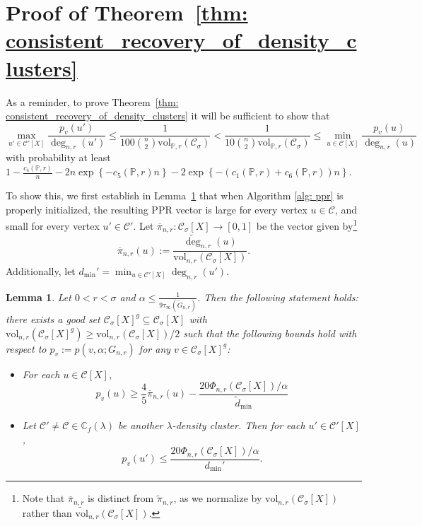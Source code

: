 \documentclass[11pt,twoside]{article}
\newtheorem{lemma}{Lemma}
\newcommand{\set}[1]{\left\{#1\right\}}
\newcommand{\vol}{\mathrm{vol}}
\newcommand{\1}{\mathbf{1}}
\newcommand{\pbf}{p}        %
\newcommand{\pibf}{\pi}
\newcommand{\Xbf}{X}             %
\newcommand{\Pbb}{\mathbb{P}}
\newcommand{\Cbb}{\mathbb{C}}
\newcommand{\Cset}{\mathcal{C}}
\newcommand{\Csig}{\Cset_{\sigma}}
\newcommand{\degminpr}{d_{\min}'}
\newcommand{\degminwt}{\widetilde{d}_{\min}}
\begin{document}
\section{Proof of Theorem~\ref{thm: consistent_recovery_of_density_clusters}}
\label{sec: proof_of_consistent_cluster_recovery}

As a reminder, to prove Theorem~\ref{thm: consistent_recovery_of_density_clusters} it will be sufficient to show that
\begin{equation}
\label{eqn: PPR_gap}
\max_{u' \in \Cset'[\Xbf]} \frac{p_v(u')}{\deg_{n,r}(u')} \leq \frac{1}{100 {n \choose 2} \vol_{\Pbb,r}(\Csig)} < \frac{1}{10 {n \choose 2} \vol_{\Pbb,r}(\Csig)} \leq \min_{u \in \Cset[\Xbf]} \frac{p_v(u)}{\deg_{n,r}(u)}
\end{equation}
with probability at least $1 - \frac{c_4(\Pbb,r)}{n} - 2n\exp\set{-c_5(\Pbb,r)n} - 2\exp\set{-(c_1(\Pbb,r) + c_6(\Pbb,r))n}$. 

To show this, we first establish in Lemma~\ref{lem: setup} that when Algorithm \ref{alg: ppr} is properly initialized, the resulting PPR vector is large for every vertex $u \in \Cset$, and small for every vertex $u' \in \Cset'$. Let $\overline{\pibf}_{n,r}: \Csig[\Xbf] \to [0,1]$ be the vector given by\footnote{Note that $\overline{\pibf}_{n,r}$ is distinct from $\widetilde{\pibf}_{n,r}$, as we normalize by $\vol_{n,r}(\Csig[\Xbf])$ rather than $\widetilde{\vol}_{n,r}(\Csig[\Xbf])$.} 
\begin{equation*}
\overline{\pibf}_{n,r}(u) := \frac{\widetilde{\deg}_{n,r}(u)}{\vol_{n,r}(\Csig[\Xbf])}.
\end{equation*} Additionally, let $\degminpr = \min_{u \in \Cset'[\Xbf]} \deg_{n,r}(u')$. 

\begin{lemma} 
	\label{lem: setup}
	Let $0 < r < \sigma$ and $\alpha \leq \frac{1}{9 \tau_{\infty}(\widetilde{G}_{n,r})}$. Then the following statement holds: there exists a good set $\Csig[\Xbf]^g \subseteq \Csig[\Xbf]$ with $\vol_{n,r}(\Csig[\Xbf]^g) \geq \vol_{n,r}(\Csig[\Xbf])/2$ such that the following bounds hold with respect to $\pbf_v := \pbf(v,\alpha;G_{n,r})$ for any $v \in \Csig[\Xbf]^g$:
	\begin{itemize}
		\item For each $u \in \Cset[\Xbf]$,
		\begin{equation}
		\label{eqn: lower_bound_PPR_in_cluster}
		\pbf_v(u) \geq \frac{4}{5} \overline{\pibf}_{n,r}(u) - \frac{20 \Phi_{n,r}(\Csig[\Xbf])/\alpha}{\degminwt}
		\end{equation}
		\item Let $\Cset' \neq \Cset \in \Cbb_f(\lambda)$ be another $\lambda$-density cluster. Then for each $u' \in \Cset'[\Xbf]$,
		\begin{equation}
		\label{eqn: upper_bound_PPR_in_other_cluster}
		\pbf_v(u') \leq \frac{20 \Phi_{n,r}(\Csig[\Xbf])/\alpha}{\degminpr}.
		\end{equation}
	\end{itemize}
\end{lemma}
\end{document}
